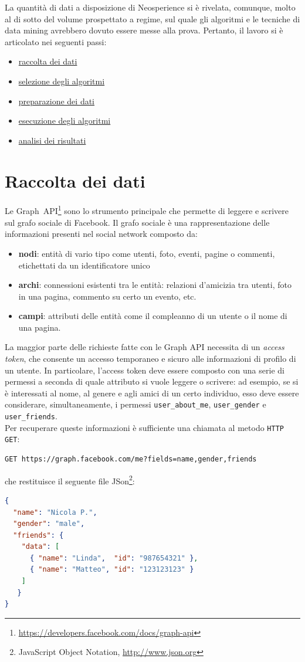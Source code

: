La quantit\`a di dati a disposizione di Neosperience si \`e rivelata, comunque, molto al di sotto del volume prospettato a regime, sul quale gli algoritmi e le tecniche di data mining avrebbero dovuto essere messe alla prova. Pertanto, il lavoro si \`e articolato nei seguenti passi:
\begin{itemize}
\item \hyperref[raccolta_dati]{raccolta dei dati}
\item \hyperref[selezione_algoritmi]{selezione degli algoritmi}
\item \hyperref[preparazione_dati]{preparazione dei dati}
\item \hyperref[esecuzione_algoritmi]{esecuzione degli algoritmi}
\item \hyperref[capitolo4]{analisi dei risultati}
\end{itemize}
\section{Raccolta dei dati}
\label{raccolta_dati}
Le \mbox{Graph API}\footnote{\url{https://developers.facebook.com/docs/graph-api}} sono lo strumento principale che permette di leggere e scrivere sul grafo sociale di Facebook. Il grafo sociale \`e una rappresentazione delle informazioni presenti nel social network composto da:
\begin{itemize}
\item \textbf{nodi}: entit\`a di vario tipo come utenti, foto, eventi, pagine o commenti, etichettati da un identificatore unico
\item \textbf{archi}: connessioni esistenti tra le entit\`a: relazioni d'amicizia tra utenti, foto in una pagina, commento su certo un evento, etc.
\item \textbf{campi}: attributi delle entit\`a come il compleanno di un utente o il nome di una pagina.
\end{itemize}
La maggior parte delle richieste fatte con le Graph API necessita di un \textit{access token}, che consente un accesso temporaneo e sicuro alle informazioni di profilo di un utente. In particolare, l'access token deve essere composto con una serie di permessi a seconda di quale attributo si vuole leggere o scrivere: ad esempio, se si \`e interessati al nome, al genere e agli amici di un certo individuo, esso deve essere considerare, simultaneamente, i permessi \texttt{user\_about\_me}, \texttt{user\_gender} e \texttt{user\_friends}.\\
Per recuperare queste informazioni \`e sufficiente una chiamata al metodo \texttt{HTTP GET}:
\begin{lstlisting}[basicstyle=\normalfont\ttfamily\scriptsize,backgroundcolor=\color{background}]
GET https://graph.facebook.com/me?fields=name,gender,friends
\end{lstlisting}
che restituisce il seguente file JSon\footnote{JavaScript Object Notation, \url{http://www.json.org}}:
\begin{lstlisting}[language=json,firstnumber=1]
{
  "name": "Nicola P.", 
  "gender": "male",
  "friends": {
    "data": [
      { "name": "Linda",  "id": "987654321" },
      {	"name": "Matteo", "id": "123123123" }
    ]
   }
}
\end{lstlisting}


